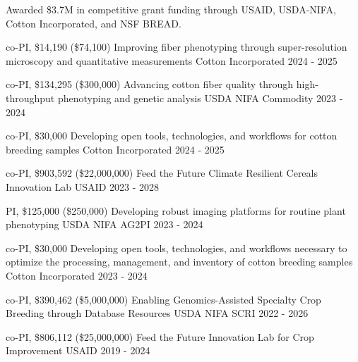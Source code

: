 
  \cvsummarytext
    {Awarded \$3.7M in competitive grant funding through USAID, USDA-NIFA, Cotton Incorporated, and NSF BREAD.}

\begin{cvgrants}

  \cvgrant
    {co-PI, \$14,190 (\$74,100)}
    {Improving fiber phenotyping through super-resolution microscopy and quantitative measurements}
    {Cotton Incorporated} %
    {2024 - 2025}
    {
    }
  
  \cvgrant
    {co-PI, \$134,295 (\$300,000)}
    {Advancing cotton fiber quality through high-throughput phenotyping and genetic analysis}
    {USDA NIFA Commodity} %
    {2023 - 2024}
    {
    }

  \cvgrant
    {co-PI, \$30,000}
    {Developing open tools, technologies, and workflows for cotton breeding samples}
    {Cotton Incorporated} %
    {2024 - 2025}
    {
    }

  \cvgrant
    {co-PI, \$903,592 (\$22,000,000)}
    {Feed the Future Climate Resilient Cereals Innovation Lab}
    {USAID} %
    {2023 - 2028}
    {
    }

  \cvgrant
    {PI, \$125,000 (\$250,000)}
    {Developing robust imaging platforms for routine plant phenotyping}
    {USDA NIFA AG2PI} %
    {2023 - 2024}
    {
    }

  \cvgrant
    {co-PI, \$30,000}
    {Developing open tools, technologies, and workflows necessary to optimize the processing, management, and inventory of cotton breeding samples}
    {Cotton Incorporated} %
    {2023 - 2024}
    {
    }

  \cvgrant
    {co-PI, \$390,462 (\$5,000,000)}
    {Enabling Genomics-Assisted Specialty Crop Breeding through Database Resources}
    {USDA NIFA SCRI} %
    {2022 - 2026}
    {
    }

  \cvgrant
    {co-PI, \$806,112 (\$25,000,000)}
    {Feed the Future Innovation Lab for Crop Improvement}
    {USAID} %
    {2019 - 2024}
    {
    }


\end{cvgrants}
